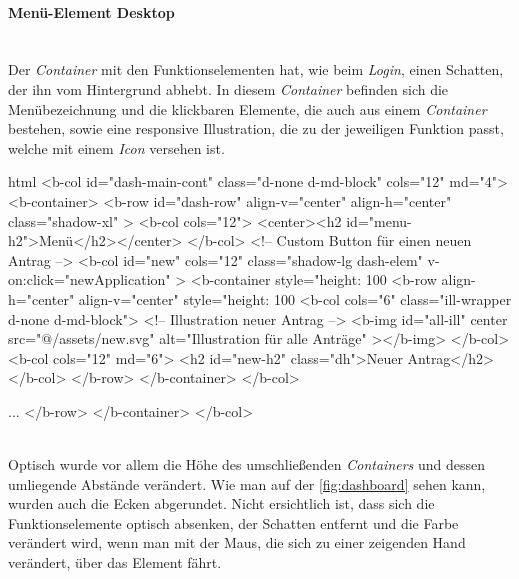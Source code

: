 \paragraph{Menü-Element Desktop}
~\\
Der \textit{Container} mit den Funktionselementen hat, wie beim \textit{Login}, einen Schatten, der ihn vom Hintergrund abhebt. In diesem \textit{Container} befinden sich die Menübezeichnung und die klickbaren Elemente, die auch aus einem \textit{Container} bestehen, sowie eine responsive Illustration, die zu der jeweiligen Funktion passt, welche mit einem \textit{Icon} versehen ist. 
\begin{code}{html}
<b-col id="dash-main-cont" class="d-none d-md-block" cols="12" md="4">
	<b-container>
		<b-row
			id="dash-row"
			align-v="center"
			align-h="center"
			class="shadow-xl"
		>
			<b-col cols="12">
				<center><h2 id="menu-h2">Menü</h2></center>
			</b-col>
			<!-- Custom Button für einen neuen Antrag -->
			<b-col
				id="new"
				cols="12"
				class="shadow-lg dash-elem"
				v-on:click="newApplication"
			>
				<b-container style="height: 100%
					<b-row align-h="center" align-v="center" style="height: 100%
						<b-col cols="6" class="ill-wrapper d-none d-md-block">
						<!-- Illustration neuer Antrag -->
							<b-img
								id="all-ill"
								center
								src="@/assets/new.svg"
								alt="Illustration für alle Anträge"
							></b-img>
						</b-col>
						<b-col cols="12" md="6">
							<h2 id="new-h2" class="dh">Neuer Antrag</h2>
						</b-col>
					</b-row>
				</b-container>
			</b-col>
			
			...
		</b-row>
	</b-container>
</b-col>
\end{code}
	\label{list:menuhtml} ~\\
Optisch wurde vor allem die Höhe des umschließenden \textit{Containers} und dessen umliegende Abstände verändert. Wie man auf der \autoref{fig:dashboard} sehen kann, wurden auch die Ecken abgerundet. Nicht ersichtlich ist, dass sich die Funktionselemente optisch absenken, der Schatten entfernt und die Farbe verändert wird, wenn man mit der Maus, die sich zu einer zeigenden Hand verändert, über das Element fährt. 
	\label{list:cssmenu} ~\\

